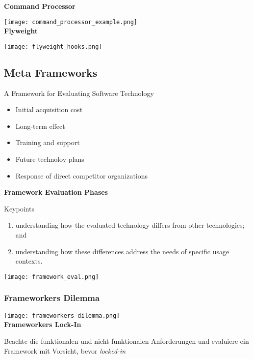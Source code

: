 \textbf{Command Processor}

\texttt{[image: command\_processor\_example.png]} \\

\textbf{Flyweight}

\texttt{[image: flyweight\_hooks.png]}

\subsection{Meta Frameworks}
A Framework for Evaluating Software Technology
\begin{itemize}
    \item Initial acquisition cost
    \item Long-term effect
    \item Training and support
    \item Future technoloy plans
    \item Response of direct competitor organizations
\end{itemize}
\vspace{10pt}
\textbf{Framework Evaluation Phases}

Keypoints

\begin{enumerate}
    \item understanding how the evaluated technology differs from other technologies; and
    \item understanding how these differences address the needs of specific usage contexts.
\end{enumerate}

\texttt{[image: framework\_eval.png]}

\subsubsection{Frameworkers Dilemma}

\texttt{[image: frameworkers-dilemma.png]} \\

\textbf{Frameworkers Lock-In}

Beachte die funktionalen und nicht-funktionalen Anforderungen und evaluiere ein Framework mit Vorsicht, bevor \textit{locked-in}

